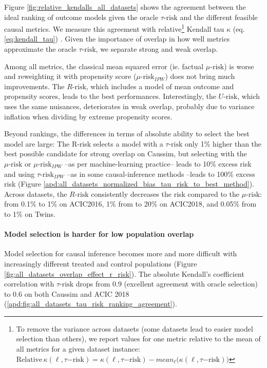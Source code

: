 \documentclass[a4paper,num-refs]{oup-contemporary}%
\begin{document}
Figure \ref{fig:relative_kendalls_all_datasets} shows the agreement between the
ideal ranking of outcome models given the oracle $\tau\text{-risk}$ and the different
feasible causal metrics. We measure this agreement with relative\footnote{To
    remove the variance across datasets (some datasets lead to easier model
    selection than others), we report values for one metric relative to the mean of
    all metrics for a given dataset instance: $\text{Relative} \,
        \kappa(\ell,\tau\mathrm{{-risk}})= \kappa(\ell,\tau\mathrm{{-risk}}) -
        mean_{\ell}\big(\kappa(\ell,\tau\mathrm{{-risk}})\big)$} Kendall tau $\kappa$
(eq. \ref{eq:kendall_tau}) \cite{kendall_new_1938}. Given the importance of
overlap in how well metrics approximate the oracle $\tau\text{-risk}$, we
separate strong and weak overlap.

Among all metrics, the classical mean squared error (ie. factual
$\mu\text{-risk}$) is worse and reweighting it with propensity score
($\mu\text{-risk}_{IPW}$) does not bring much improvements. The
$R\text{-risk}$, which includes a model of mean outcome and propensity
scores, leads to the best performances. Interestingly, the
$U\text{-risk}$, which uses the same nuisances, deteriorates in weak overlap, probably due to variance
inflation when dividing by extreme propensity scores.

Beyond rankings, the differences in terms of absolute
ability to select the best model are large: The R-risk selects a model
with a $\tau\text{-risk}$ only 1\% higher
than the best
possible candidate for strong overlap on Caussim, but selecting with
the $\mu\text{-risk}$ or $\mu\text{-risk}_{IPW}$ --as per machine-learning
practice-- leads to 10\% excess risk and using $\tau\text{-risk}_{IPW}$
--as in some causal-inference methods \cite{athey2016recursive,gutierrez_causal_2016}--leads to 100\% excess risk
(Figure
\ref{apd:all_datasets_normalized_bias_tau_risk_to_best_method}). Across
datasets, the $R\text{-risk}$ consistently decreases the
risk compared to the $\mu\text{-risk}$: from
0.1\% to 1\% on ACIC2016,  1\% from to 20\% on ACIC2018,
and 0.05\% from to 1\% on Twins.


\paragraph{Model selection is harder for low population
    overlap}

Model selection for causal inference becomes more and more difficult with
increasingly different treated and control populations (Figure
\ref{fig:all_datasets_overlap_effect_r_risk}). The absolute Kendall's
coefficient correlation with $\tau\text{-risk}$ drops from 0.9
(excellent agreement with oracle selection) to 0.6 on both Caussim and ACIC 2018
(\ref{apd:fig:all_datasets_tau_risk_ranking_agreement}).
\end{document}
